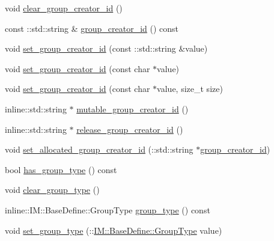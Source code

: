 \begin{DoxyCompactItemize}
\item 
void \hyperlink{class_i_m_1_1_base_define_1_1_client_group_info_a4c43357d74f6cc227eaf0140150df7bc}{clear\+\_\+group\+\_\+creator\+\_\+id} ()
\item 
const \+::std\+::string \& \hyperlink{class_i_m_1_1_base_define_1_1_client_group_info_ad6c90657bad08528cbd453d4c5ccd64b}{group\+\_\+creator\+\_\+id} () const 
\item 
void \hyperlink{class_i_m_1_1_base_define_1_1_client_group_info_abb1eff5ce015b6236ab6d95c9366fab4}{set\+\_\+group\+\_\+creator\+\_\+id} (const \+::std\+::string \&value)
\item 
void \hyperlink{class_i_m_1_1_base_define_1_1_client_group_info_a1c3bb500addef78343a1a3704e17372d}{set\+\_\+group\+\_\+creator\+\_\+id} (const char $\ast$value)
\item 
void \hyperlink{class_i_m_1_1_base_define_1_1_client_group_info_a67ee6003521151d58137a6d5e35ad578}{set\+\_\+group\+\_\+creator\+\_\+id} (const char $\ast$value, size\+\_\+t size)
\item 
inline\+::std\+::string $\ast$ \hyperlink{class_i_m_1_1_base_define_1_1_client_group_info_aa7cad167596e6c84222fcda483024bb0}{mutable\+\_\+group\+\_\+creator\+\_\+id} ()
\item 
inline\+::std\+::string $\ast$ \hyperlink{class_i_m_1_1_base_define_1_1_client_group_info_ad4cb88c28ab0ca17f695b27dde8801f1}{release\+\_\+group\+\_\+creator\+\_\+id} ()
\item 
void \hyperlink{class_i_m_1_1_base_define_1_1_client_group_info_ac25208a4161b06075e27b288a9a1897b}{set\+\_\+allocated\+\_\+group\+\_\+creator\+\_\+id} (\+::std\+::string $\ast$\hyperlink{class_i_m_1_1_base_define_1_1_client_group_info_ad6c90657bad08528cbd453d4c5ccd64b}{group\+\_\+creator\+\_\+id})
\item 
bool \hyperlink{class_i_m_1_1_base_define_1_1_client_group_info_a5a14370fe04dc1da20dd15e3bd48e3d2}{has\+\_\+group\+\_\+type} () const 
\item 
void \hyperlink{class_i_m_1_1_base_define_1_1_client_group_info_a5058bca4873da0a56f0357920c258a01}{clear\+\_\+group\+\_\+type} ()
\item 
inline\+::\+I\+M\+::\+Base\+Define\+::\+Group\+Type \hyperlink{class_i_m_1_1_base_define_1_1_client_group_info_aeabfed8239a9cb1da8eec38acda6ec26}{group\+\_\+type} () const 
\item 
void \hyperlink{class_i_m_1_1_base_define_1_1_client_group_info_a0031112bc2bdc79cb63d52175b244be8}{set\+\_\+group\+\_\+type} (\+::\hyperlink{namespace_i_m_1_1_base_define_a6ca6b4875848a9b5da46c019cf9b7d63}{I\+M\+::\+Base\+Define\+::\+Group\+Type} value)

\end{DoxyCompactItemize}
